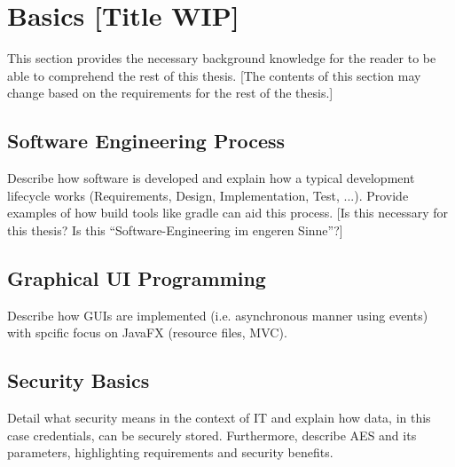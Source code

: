 \section{Basics {[Title WIP]}}\label{basics}

This section provides the necessary background knowledge for the reader to be able to comprehend the rest of this thesis. 
{[The contents of this section may change based on the requirements for the rest of the thesis.]}

\subsection{Software Engineering Process}\label{basics_softwareengineering}

Describe how software is developed and explain how a typical development lifecycle works {(Requirements, Design, Implementation, Test, ...)}.
Provide examples of how build tools like gradle can aid this process.
{[Is this necessary for this thesis? Is this ``Software-Engineering im engeren Sinne''?]}

\subsection{Graphical UI Programming}\label{basics_gui}

Describe how GUIs are implemented {(i.e. asynchronous manner using events)} with spcific focus on JavaFX {(resource files, MVC)}.

\subsection{Security Basics}\label{basics_security}

Detail what security means in the context of IT and explain how data, in this case credentials, can be securely stored.
Furthermore, describe AES and its parameters, highlighting requirements and security benefits.
